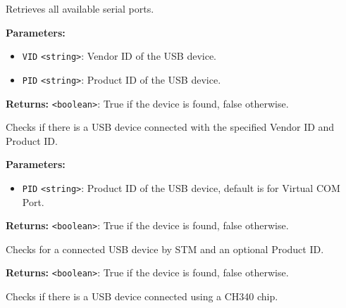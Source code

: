 \documentclass[12pt,a4paper]{article}
\begin{document}
\noindent Retrieves all available serial ports.

\vspace{5mm}
\noindent {}


\noindent \textbf{Parameters:}
\begin{itemize}
  \item \texttt{VID} \texttt{<string>}: Vendor ID of the USB device.
  \item \texttt{PID} \texttt{<string>}: Product ID of the USB device.
\end{itemize}

\noindent \textbf{Returns:} \texttt{<boolean>}: True if the device is found, false otherwise.

\noindent Checks if there is a USB device connected with the specified Vendor ID and Product ID.

\vspace{5mm}
\noindent {}


\noindent \textbf{Parameters:}
\begin{itemize}
  \item \texttt{PID} \texttt{<string>}: Product ID of the USB device, default is for Virtual COM Port.
\end{itemize}

\noindent \textbf{Returns:} \texttt{<boolean>}: True if the device is found, false otherwise.

\noindent Checks for a connected USB device by STM and an optional Product ID.

\vspace{5mm}
\noindent {}


\noindent \textbf{Returns:} \texttt{<boolean>}: True if the device is found, false otherwise.

\noindent Checks if there is a USB device connected using a CH340 chip.

\vspace{5mm}
\noindent {}
\end{document}
